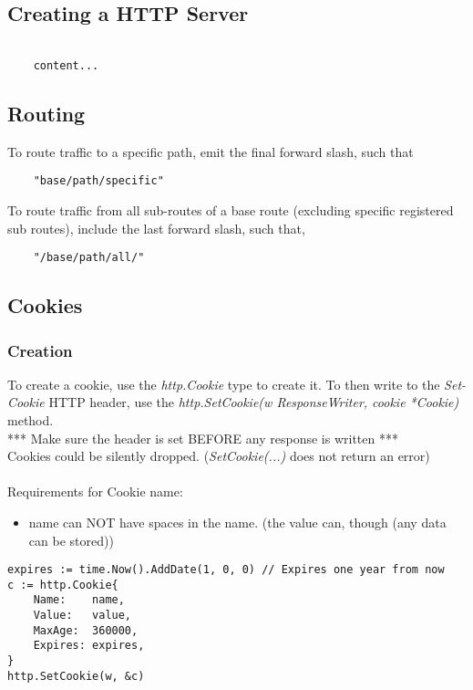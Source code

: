 \documentclass[]{article}
\renewcommand{\it}[1]{\textit{#1}}
\begin{document}
\subsection{Creating a HTTP Server}
\begin{lstlisting}

	content...
\end{lstlisting}

\subsection{Routing}
To route traffic to a specific path, emit the final forward slash, such that 
\begin{lstlisting}
	"base/path/specific"
\end{lstlisting}
To route traffic from all sub-routes of a base route (excluding specific registered sub routes), include the last forward slash, such that,
\begin{lstlisting}
	"/base/path/all/"
\end{lstlisting}


\subsection{Cookies}
\subsubsection{Creation}
To create a cookie, use the \it{http.Cookie}  type to create it.  To then write to the \it{Set-Cookie} HTTP header, use the \it{http.SetCookie(w ResponseWriter, cookie *Cookie)} method.\\
*** Make sure the header is set BEFORE any response is written *** \\
Cookies could be silently dropped.  (\it{SetCookie(...)} does not return an error) \\\\
Requirements for Cookie name:
\begin{itemize}
	\item name can NOT have spaces in the name. (the value can, though (any data can be stored))
\end{itemize}

\begin{lstlisting}
expires := time.Now().AddDate(1, 0, 0) // Expires one year from now
c := http.Cookie{
	Name:    name,
	Value:   value,
	MaxAge:  360000,
	Expires: expires,
}
http.SetCookie(w, &c)
\end{lstlisting}
\end{document}
